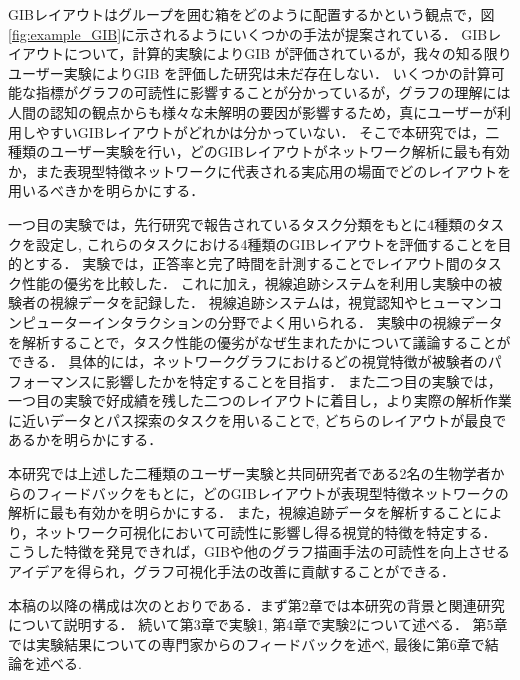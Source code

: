 \documentclass{kuee}
\begin{document}
GIBレイアウトはグループを囲む箱をどのように配置するかという観点で，図\ref{fig:example_GIB}に示されるようにいくつかの手法が提案されている．
GIBレイアウトについて，計算的実験\cite{chaturvedi2014group,onoue2017optimal}によりGIB が評価されているが，我々の知る限りユーザー実験によりGIB を評価した研究は未だ存在しない．
いくつかの計算可能な指標がグラフの可読性に影響することが分かっている\cite{harel2000fast,koren2003drawing,hachul2004drawing,giacomo}が，グラフの理解には人間の認知の観点からも様々な未解明の要因が影響するため，真にユーザーが利用しやすいGIBレイアウトがどれかは分かっていない．
そこで本研究では，二種類のユーザー実験を行い，どのGIBレイアウトがネットワーク解析に最も有効か，また表現型特徴ネットワークに代表される実応用の場面でどのレイアウトを用いるべきかを明らかにする．

一つ目の実験では，先行研究\cite{Vehlow2017VisualizingGS,saket2014group}で報告されているタスク分類をもとに4種類のタスクを設定し, これらのタスクにおける4種類のGIBレイアウトを評価することを目的とする．
実験では，正答率と完了時間を計測することでレイアウト間のタスク性能の優劣を比較した．
これに加え，視線追跡システムを利用し実験中の被験者の視線データを記録した．
視線追跡システムは，視覚認知やヒューマンコンピューターインタラクションの分野でよく用いられる．
実験中の視線データを解析することで，タスク性能の優劣がなぜ生まれたかについて議論することができる\cite{andrienko2012visual,duchowski2007eye,kurzhals2014evaluating}．
具体的には，ネットワークグラフにおけるどの視覚特徴が被験者のパフォーマンスに影響したかを特定することを目指す．
また二つ目の実験では，一つ目の実験で好成績を残した二つのレイアウトに着目し，より実際の解析作業に近いデータとパス探索のタスクを用いることで, どちらのレイアウトが最良であるかを明らかにする．

本研究では上述した二種類のユーザー実験と共同研究者である2名の生物学者からのフィードバックをもとに，どのGIBレイアウトが表現型特徴ネットワークの解析に最も有効かを明らかにする．
また，視線追跡データを解析することにより，ネットワーク可視化において可読性に影響し得る視覚的特徴を特定する．
こうした特徴を発見できれば，GIBや他のグラフ描画手法の可読性を向上させるアイデアを得られ，グラフ可視化手法の改善に貢献することができる．


本稿の以降の構成は次のとおりである．まず第2章では本研究の背景と関連研究について説明する．
続いて第3章で実験1, 第4章で実験2について述べる．
第5章では実験結果についての専門家からのフィードバックを述べ, 最後に第6章で結論を述べる.

\end{document}
